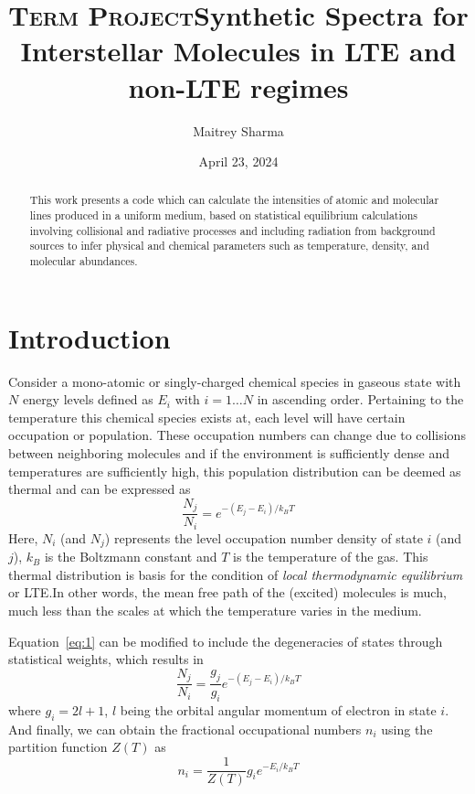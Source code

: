 \documentclass{article}
\title{\textsc{Term Project}}
\title{\textbf{Synthetic Spectra for Interstellar
        Molecules in LTE and non-LTE regimes}}
\author{Maitrey Sharma}
\date{April 23, 2024}
\begin{document}
\maketitle
\begin{abstract}
This work presents a code which can calculate the intensities of 
atomic and molecular lines produced in a uniform medium, 
based on statistical equilibrium calculations involving 
collisional and radiative processes and including radiation 
from background sources to infer physical and chemical 
parameters such as temperature, density, and molecular abundances.
\end{abstract}
\section{Introduction}
Consider a mono-atomic or singly-charged chemical species in gaseous state with
\(N\) energy levels defined as \(E_i\) with \(i = 1 \ldots N\) in ascending
order. Pertaining to the temperature this chemical species exists at, each
level will have certain occupation or population. These occupation numbers can
change due to collisions between neighboring molecules and if the environment
is sufficiently dense and temperatures are sufficiently high, this population
distribution can be deemed as thermal and can be expressed as
\begin{equation}\label{eq:1}
    \dfrac{N_j}{N_i} = {e}^{-(E_j - E_i)/k_B T}
\end{equation}
Here, \(N_i\) (and \(N_j\)) represents the level occupation number density of state
\(i\) (and \(j\)), \(k_B\) is the Boltzmann constant and \(T\) is the temperature of the
gas. This thermal distribution is basis for the condition of \textit{local thermodynamic
    equilibrium} or LTE.\@ In other words, the mean free path of the (excited) molecules
is much, much less than the scales at which the temperature varies in the medium.

Equation~\ref{eq:1} can be modified to include the degeneracies of states through
statistical weights, which results in
\begin{equation}
    \dfrac{N_j}{N_i} = \dfrac{g_j}{g_i} {e}^{-(E_j - E_i)/k_B T}
\end{equation}
where \(g_i = 2l+ 1\), \(l\) being the orbital angular momentum of electron in state
\(i\). And finally, we can obtain the fractional occupational numbers \(n_i\) using the
partition function \(Z(T)\) as
\begin{equation}
    n_i = \dfrac{1}{Z(T)} g_i {e}^{-E_i / k_B T}
\end{equation} 
\end{document}
